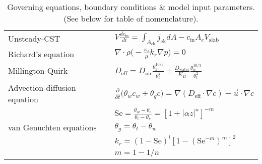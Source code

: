 \documentclass[journal=esthag,manuscript=article]{achemso}
\begin{document}
\begin{table}[htb!]
 \centering
 \caption{Governing equations, boundary conditions \& model input parameters. (See below for table of nomenclature).}
 \label{tbl:eqns_bc_parameters}
 \bigskip
 \begin{tabular}{l l}
  \toprule
  Unsteady-CST                            & $V\frac{d c_\mathrm{in}}{d t} = \int_{A_\mathrm{ck}} j_\mathrm{ck} dA - c_\mathrm{in} A_e V_\mathrm{slab}$                                                                  \\
  Richard's equation                       & $\nabla \cdot \rho \Big( - \frac{\kappa_s}{\mu} k_r \nabla p \Big) = 0$                                                               \\
  Millington-Quirk                         & $D_\mathrm{eff} = D_\mathrm{air}\frac{\theta_g^{10/3}}{\theta_t^2} + \frac{D_\mathrm{water}}{K_H} \frac{\theta_w^{10/3}}{\theta_t^2}$ \\
  Advection-diffusion equation             & $\frac{\partial}{\partial t} \Big( \theta_w c_w + \theta_g c \Big) = \nabla (D_\mathrm{eff} \cdot \nabla c) - \vec{u} \cdot \nabla c$ \\
  \multirow{3}{*}{van Genuchten equations} & $\mathrm{Se} = \frac{\theta_w - \theta_r}{\theta_t - \theta_r} = [1 + |\alpha z|^n]^{-m}$                                             \\
                                           & $\theta_g = \theta_t - \theta_w$                                                                                                      \\
                                           & $k_r = (1 - \mathrm{Se})^{l} [1 - (\mathrm{Se}^{-m})^m]^2$                                                                            \\
                                           & $m = 1 - 1/n$                                                                                                                         \\
  \bottomrule
 \end{tabular}
 \bigskip

\end{table}
\end{document}
